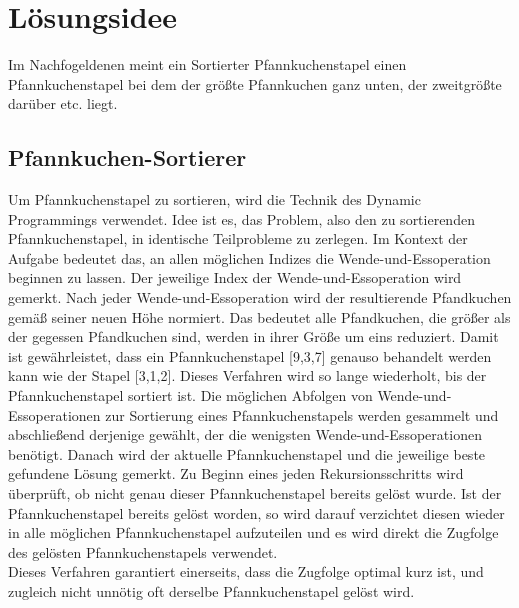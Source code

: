 \maketitle
\tableofcontents

\vspace{0.5cm}


\section{Lösungsidee}\label{sec:losungsidee}
Im Nachfogeldenen meint ein Sortierter Pfannkuchenstapel einen
Pfannkuchenstapel bei dem der grö{\ss}te Pfannkuchen ganz unten,
der zweitgrö{\ss}te darüber etc. liegt. \\
\subsection{Pfannkuchen-Sortierer}\label{subsec:pfannkuchen-sortierer}
Um Pfannkuchenstapel zu sortieren, wird die Technik des Dynamic Programmings verwendet.
Idee ist es, das Problem, also den zu sortierenden Pfannkuchenstapel, in identische Teilprobleme zu zerlegen.
Im Kontext der Aufgabe bedeutet das, an allen möglichen Indizes die Wende-und-Essoperation beginnen zu lassen.
Der jeweilige Index der Wende-und-Essoperation wird gemerkt.
Nach jeder Wende-und-Essoperation wird der resultierende Pfandkuchen gemä{\ss} seiner neuen Höhe normiert.
Das bedeutet alle Pfandkuchen, die grö{\ss}er als der gegessen Pfandkuchen sind, werden in ihrer Grö{\ss}e um eins reduziert.
Damit ist gewährleistet, dass ein Pfannkuchenstapel [9,3,7] genauso behandelt werden kann wie der Stapel [3,1,2].
Dieses Verfahren wird so lange wiederholt, bis der Pfannkuchenstapel sortiert ist.
Die möglichen Abfolgen von Wende-und-Essoperationen zur Sortierung eines Pfannkuchenstapels werden gesammelt
und abschlie{\ss}end derjenige gewählt, der die wenigsten Wende-und-Essoperationen benötigt.
Danach wird der aktuelle Pfannkuchenstapel und die jeweilige beste gefundene Lösung gemerkt.
Zu Beginn eines jeden Rekursionsschritts wird überprüft, ob nicht genau dieser Pfannkuchenstapel bereits gelöst wurde.
Ist der Pfannkuchenstapel bereits gelöst worden, so wird darauf verzichtet diesen wieder in alle möglichen Pfannkuchenstapel
aufzuteilen und es wird direkt die Zugfolge des gelösten Pfannkuchenstapels verwendet. \\
Dieses Verfahren garantiert einerseits, dass die Zugfolge optimal kurz ist, und zugleich nicht unnötig
oft derselbe Pfannkuchenstapel gelöst wird. \\
